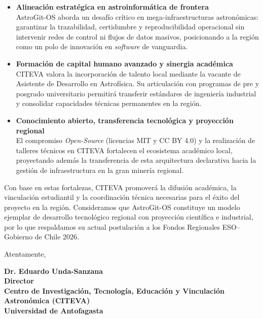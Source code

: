 \documentclass[letterpaper,10.5pt]{article}
\begin{document}
\begin{itemize}
    \vspace{-2.5mm}
    \item \textbf{Alineación estratégica en astroinformática de frontera} \\
    AstroGit-OS aborda un desafío crítico en mega-infraestructuras astronómicas: garantizar la trazabilidad, certidumbre y reproducibilidad operacional sin intervenir redes de control ni flujos de datos masivos, posicionando a la región como un polo de innovación en \textit{software} de vanguardia.
    \vspace{-1mm}
    \item \textbf{Formación de capital humano avanzado y sinergia académica} \\
    CITEVA valora la incorporación de talento local mediante la vacante de Asistente de Desarrollo en Astrofísica. Su articulación con programas de pre y posgrado universitario permitirá transferir estándares de ingeniería industrial y consolidar capacidades técnicas permanentes en la región.
    \vspace{-1mm}
    \item \textbf{Conocimiento abierto, transferencia tecnológica y proyección regional} \\
    El compromiso \textit{Open-Source} (licencias MIT y CC BY 4.0) y la realización de talleres técnicos en CITEVA fortalecen el ecosistema académico local, proyectando además la transferencia de esta arquitectura declarativa hacia la gestión de infraestructura en la gran minería regional.
\end{itemize}

Con base en estas fortalezas, CITEVA promoverá la difusión académica, la vinculación estudiantil y la coordinación técnica necesarias para el éxito del proyecto en la región. Consideramos que AstroGit-OS constituye un modelo ejemplar de desarrollo tecnológico regional con proyección científica e industrial, por lo que respaldamos su actual postulación a los Fondos Regionales ESO--Gobierno de Chile 2026.

\vspace{4mm}
Atentamente,
\vspace{18mm}

\vfill
\begin{center}
    \color {primary}
    \bfseries
    Dr. Eduardo Unda-Sanzana \\
    \mdseries
    Director \\
    Centro de Investigación, Tecnología, Educación y Vinculación Astronómica (CITEVA)\\
    Universidad de Antofagasta
\end{center}

\vspace{-2mm}
\end{document}
